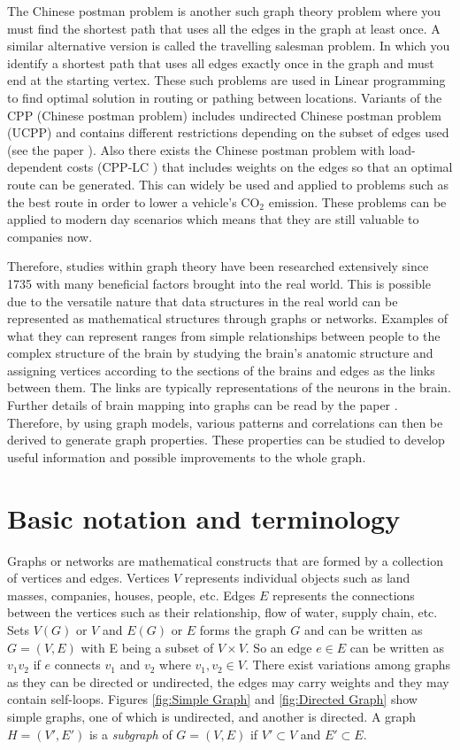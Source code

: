 The Chinese postman problem is another such graph theory problem where you must find the shortest path that uses all the edges in the graph at least once. A similar alternative version is called the travelling salesman problem. In which you identify a shortest path that uses all edges exactly once in the graph and must end at the starting vertex. These such problems are used in Linear programming to find optimal solution in routing or pathing between locations. Variants of the CPP (Chinese postman problem) includes undirected Chinese postman problem (UCPP) and contains different restrictions depending on the subset of edges used (see the paper \cite{IrnichStefan2008Uppw}). Also there exists the Chinese postman problem with load-dependent costs (CPP-LC \cite{CorberánÁngel2018TCPP}) that includes weights on the edges so that an optimal route can be generated. This can widely be used and applied to problems such as the best route in order to lower a vehicle's CO$_2$ emission. These problems can be applied to modern day scenarios which means that they are still valuable to companies now.
\newline

Therefore, studies within graph theory have been researched extensively since 1735 with many beneficial factors brought into the real world. This is possible due to the versatile nature that data structures in the real world can be represented as mathematical structures through graphs or networks. Examples of what they can represent ranges from simple relationships between people to the complex structure of the brain by studying the brain's anatomic structure and assigning vertices according to the sections of the brains and edges as the links between them. The links are typically representations of the neurons in the brain. Further details of brain mapping into graphs can be read by the paper \cite{articlebrain}. Therefore, by using graph models, various patterns and correlations can then be derived to generate graph properties. These properties can be studied to develop useful information and possible improvements to the whole graph.

\section{Basic notation and terminology}
Graphs or networks are mathematical constructs that are formed by a collection of vertices and edges. Vertices $V$ represents individual objects such as land masses, companies, houses, people, etc. Edges $E$ represents the connections between the vertices such as their relationship, flow of water, supply chain, etc. Sets $V(G)$ or $V$ and $E(G)$ or $E$ forms the graph $G$ and can be written as $G=(V, E)$ with E being a subset of $V \times V$. So an edge $e \in E$ can be written as $v_{1}v_{2}$ if $e$ connects $v_{1}$ and $v_{2}$ where $v_{1}, v_{2} \in V$. There exist variations among graphs as they can be directed or undirected, the edges may carry weights and they may contain self-loops. Figures \ref{fig:Simple Graph} and \ref{fig:Directed Graph} show simple graphs, one of which is undirected, and another is directed. A graph $H = (V', E')$ is a \emph{subgraph} of $G=(V, E)$ if $V' \subset V$ and $E' \subset E$.

